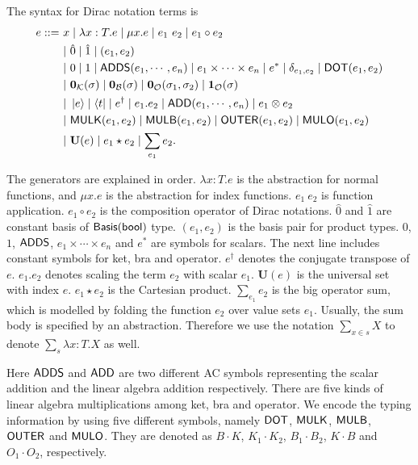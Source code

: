 \documentclass[runningheads]{llncs}
\begin{document}
\begin{definition}
    The syntax for Dirac notation terms is
    \begin{align*}
        e ::=\ & x \mid \lambda x : T.e \mid \mu x.e \mid e_1\ e_2 \mid e_1 \circ e_2 \\
        & |\ \hat{0} \mid \hat{1} \mid (e_1, e_2) \\
        & |\ 0 \mid 1 \mid \mathsf{ADDS}(e_1, \cdots, e_n)  \mid e_1 \times \cdots \times e_n \mid e^*  \mid \delta_{e_1, e_2} \mid \mathsf{DOT}(e_1, e_2) \\
        & |\ \mathbf{0}_\mathcal{K}(\sigma) \mid \mathbf{0}_\mathcal{B}(\sigma) \mid \mathbf{0}_\mathcal{O}(\sigma_1, \sigma_2) \mid \mathbf{1}_\mathcal{O}(\sigma) \\
        & |\ \ket{e} \mid \bra{t} \mid e^\dagger \mid e_1.e_2 \mid \mathsf{ADD}(e_1, \cdots, e_n) \mid e_1 \otimes e_2 \\
        & |\ \mathsf{MULK}(e_1, e_2) \mid \mathsf{MULB}(e_1, e_2) \mid \mathsf{OUTER}(e_1, e_2) \mid \mathsf{MULO}(e_1, e_2) \\
        & |\ \mathbf{U}(e) \mid e_1 \star e_2 \mid \sum_{e_1} e_2.
    \end{align*}
\end{definition}

The generators are explained in order.
$\lambda x : T.e$ is the abstraction for normal functions, and $\mu x.e$ is the abstraction for index functions.
$e_1\ e_2$ is function application. 
$e_1 \circ e_2$ is the composition operator of Dirac notations.
$\hat{0}$ and $\hat{1}$ are constant basis of $\mathsf{Basis}(\mathsf{bool})$ type.
$(e_1, e_2)$ is the basis pair for product types. $0$, $1$, $\mathsf{ADDS}$, $e_1 \times \cdots \times e_n$ and $e^*$ are symbols for scalars. 
The next line includes constant symbols for ket, bra and operator.
$e^\dagger$ denotes the conjugate transpose of $e$. $e_1.e_2$ denotes scaling the term $e_2$ with scalar $e_1$.
$\mathbf{U}(e)$ is the universal set with index $e$. $e_1 \star e_2$ is the Cartesian product. $\sum_{e_1} e_2$ is the big operator sum, which is modelled by folding the function $e_2$ over value sets $e_1$. Usually, the sum body is specified by an abstraction. Therefore we use the notation $\sum_{x \in s} X$ to denote $\sum_{s} \lambda x : T . X$ as well.
 




Here $\mathsf{ADDS}$ and $\mathsf{ADD}$ are two different AC symbols representing the scalar addition and the linear algebra addition respectively. 
There are five kinds of linear algebra multiplications among ket, bra and operator. We encode the typing information by using five different symbols, namely $\mathsf{DOT}$, $\mathsf{MULK}$, $\mathsf{MULB}$, $\mathsf{OUTER}$ and $\mathsf{MULO}$. They are denoted as $B\cdot K$, $K_1 \cdot K_2$, $B_1 \cdot B_2$, $K \cdot B$ and $O_1 \cdot O_2$, respectively.
\end{document}
